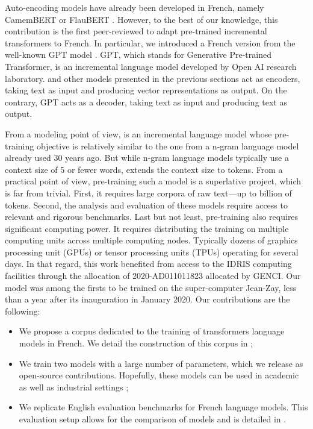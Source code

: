 Auto-encoding models have already been developed in French, namely CamemBERT \parencite{martin_20} or FlauBERT \parencite{le_20a, le_20b}. However, to the best of our knowledge, this contribution is the first peer-reviewed to adapt pre-trained incremental transformers to French. In particular, we introduced a French version from the well-known GPT model \parencite{radford_2018, radford_2019, brown_20}. GPT, which stands for Generative Pre-trained Transformer, is an incremental language model developed by Open AI research laboratory. \bert and other models presented in the previous sections act as encoders, taking text as input and producing vector representations as output. On the contrary, GPT acts as a decoder, taking text as input and producing text as output. 

From a modeling point of view, \gpt is an incremental language model whose pre-training objective is relatively similar to the one from a n-gram language model already used 30 years ago. But while n-gram language models typically use a context size of 5 or fewer words, \gpt extends the context size to  tokens. From a practical point of view, pre-training such a model is a superlative project, which is far from trivial. First, it requires large corpora of raw text—up to billion of tokens. Second, the analysis and evaluation of these models require access to relevant and rigorous benchmarks. Last but not least, pre-training also requires significant computing power. It requires distributing the training on multiple computing units across multiple computing nodes. Typically dozens of graphics processing unit (GPUs) or tensor processing units (TPUs) %
operating for several days. In that regard, this work benefited from access to the IDRIS computing facilities through the allocation of 2020-AD011011823 allocated by GENCI. Our model was among the firsts to be trained on the super-computer Jean-Zay, less than a year after its inauguration in January 2020. Our contributions are the following:
\begin{itemize}
    \item We propose a corpus dedicated to the training of transformers language models in French. We detail the construction of this corpus in  ;
    \item We train two models with a large number of parameters, which we release as open-source contributions. Hopefully, these models can be used in academic as well as industrial settings ;
    \item We replicate English evaluation benchmarks for French language models. This evaluation setup allows for the comparison of models and is detailed in .
\end{itemize}

